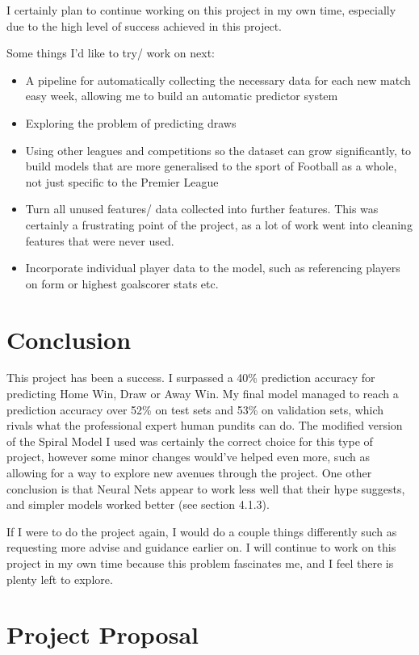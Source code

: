 \documentclass[12pt,a4paper,twoside,openright]{report}
\begin{document}
I certainly plan to continue working on this project in my own time, especially due to the high level of success achieved in this project. 

Some things I'd like to try/ work on next: 
\begin{itemize}
    \item 
    {
    A pipeline for automatically collecting the necessary data for each new match easy week, allowing me to build an automatic predictor system
    }
    \item
    {
    Exploring the problem of predicting draws
    }
    \item
    {
    Using other leagues and competitions so the dataset can grow significantly, to build models that are more generalised to the sport of Football as a whole, not just specific to the Premier League
    }
    \item
    {
    Turn all unused features/ data collected into further features. This was certainly a frustrating point of the project, as a lot of work went into cleaning features that were never used.
    }
    \item
    {
    Incorporate individual player data to the model, such as referencing players on form or highest goalscorer stats etc.
    }
\end{itemize}


\chapter{Conclusion}

This project has been a success. I surpassed a 40\% prediction accuracy for predicting Home Win, Draw or Away Win. My final model managed to reach a prediction accuracy over 52\% on test sets and 53\% on validation sets, which rivals what the professional expert human pundits can do. The modified version of the Spiral Model I used was certainly the correct choice for this type of project, however some minor changes would've helped even more, such as allowing for a way to explore new avenues through the project. One other conclusion is that Neural Nets appear to work less well that 
their hype suggests, and simpler models worked better (see section 4.1.3).

If I were to do the project again, I would do a couple things differently such as requesting more advise and guidance earlier on. I will continue to work on this project in my own time because this problem fascinates me, and I feel there is plenty left to explore.




\appendix

\chapter{Project Proposal}


\end{document}

